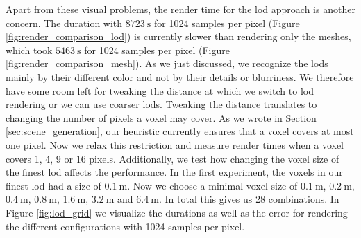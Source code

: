 Apart from these visual problems, the render time for the \ac{lod} approach is another concern.
The duration with $\SI{8723}{\s}$ for 1024 samples per pixel (Figure \ref{fig:render_comparison_lod}) is currently slower than rendering only the meshes, which took $\SI{5463}{\s}$ for 1024 samples per pixel (Figure \ref{fig:render_comparison_mesh}).
As we just discussed, we recognize the \acsp{lod} mainly by their different color and not by their details or blurriness.
We therefore have some room left for tweaking the distance at which we switch to \ac{lod} rendering or we can use coarser \acsp{lod}.
Tweaking the distance translates to changing the number of pixels a voxel may cover.
As we wrote in Section \ref{sec:scene_generation}, our heuristic currently ensures that a voxel covers at most one pixel.
Now we relax this restriction and measure render times when a voxel covers 1, 4, 9 or 16 pixels.
Additionally, we test how changing the voxel size of the finest \ac{lod} affects the performance.
In the first experiment, the voxels in our finest \ac{lod} had a size of $\SI{0.1}{\m}$.
Now we choose a minimal voxel size of $\SI{0.1}{\m}$, $\SI{0.2}{\m}$, $\SI{0.4}{\m}$, $\SI{0.8}{\m}$, $\SI{1.6}{\m}$, $\SI{3.2}{\m}$ and $\SI{6.4}{\m}$.
In total this gives us 28 combinations.
In Figure \ref{fig:lod_grid} we visualize the durations as well as the \FLIP error for rendering the different configurations with 1024 samples per pixel.
